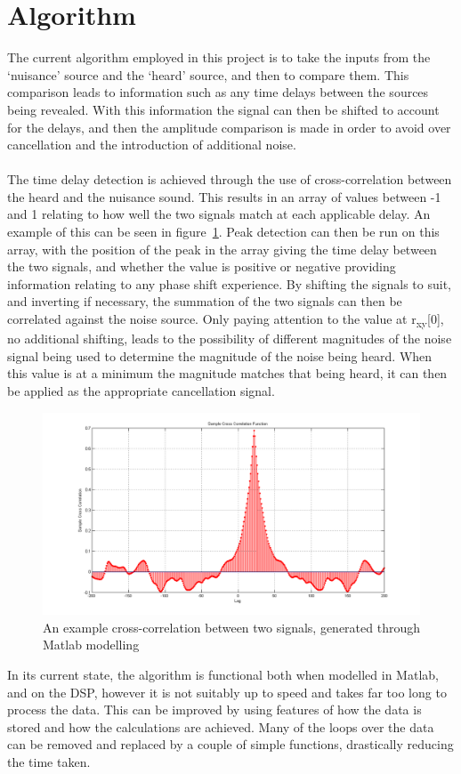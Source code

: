 \section{Algorithm}
The current algorithm employed in this project is to take the inputs from the `nuisance' source and the `heard' source, and then to compare them.
This comparison leads to information such as any time delays between the sources being revealed.
With this information the signal can then be shifted to account for the delays, and then the amplitude comparison is made in order to avoid over cancellation and the introduction of additional noise.
\\
\\
The time delay detection is achieved through the use of cross-correlation between the heard and the nuisance sound.
This results in an array of values between -1 and 1 relating to how well the two signals match at each applicable delay.
An example of this can be seen in figure~\ref{fig:crosscorr}.
Peak detection can then be run on this array, with the position of the peak in the array giving the time delay between the two signals, and whether the value is positive or negative providing information relating to any phase shift experience.
By shifting the signals to suit, and inverting if necessary, the summation of the two signals can then be correlated against the noise source.
Only paying attention to the value at r\textsubscript{xy}[0], no additional shifting, leads to the possibility of different magnitudes of the noise signal being used to determine the magnitude of the noise being heard.
When this value is at a minimum the magnitude matches that being heard, it can then be applied as the appropriate cancellation signal.


\begin{figure}[H]
	\centering
	\includegraphics[width=\textwidth]{./img/crosscorr.png}
	\caption{An example cross-correlation between two signals, generated through Matlab modelling}
	\label{fig:crosscorr}
\end{figure}

\noindent
In its current state, the algorithm is functional both when modelled in Matlab, and on the DSP, however it is not suitably up to speed and takes far too long to process the data.
This can be improved by using features of how the data is stored and how the calculations are achieved.
Many of the loops over the data can be removed and replaced by a couple of simple functions, drastically reducing the time taken.
